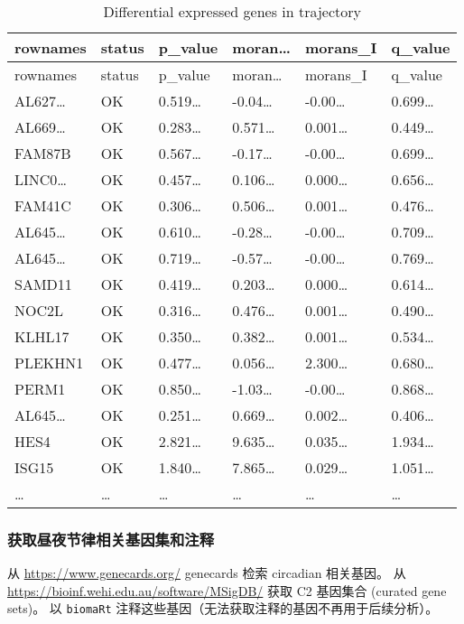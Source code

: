 \documentclass[
]{article}
\begin{document}
\begin{longtable}[]{@{}llllll@{}}
\caption{\label{tab:differential-expressed-genes-in-trajectory}Differential expressed genes in trajectory}\tabularnewline
\toprule
rownames & status & p\_value & moran\ldots{} & morans\_I & q\_value\tabularnewline
\midrule
\endfirsthead
\toprule
rownames & status & p\_value & moran\ldots{} & morans\_I & q\_value\tabularnewline
\midrule
\endhead
AL627\ldots{} & OK & 0.519\ldots{} & -0.04\ldots{} & -0.00\ldots{} & 0.699\ldots{}\tabularnewline
AL669\ldots{} & OK & 0.283\ldots{} & 0.571\ldots{} & 0.001\ldots{} & 0.449\ldots{}\tabularnewline
FAM87B & OK & 0.567\ldots{} & -0.17\ldots{} & -0.00\ldots{} & 0.699\ldots{}\tabularnewline
LINC0\ldots{} & OK & 0.457\ldots{} & 0.106\ldots{} & 0.000\ldots{} & 0.656\ldots{}\tabularnewline
FAM41C & OK & 0.306\ldots{} & 0.506\ldots{} & 0.001\ldots{} & 0.476\ldots{}\tabularnewline
AL645\ldots{} & OK & 0.610\ldots{} & -0.28\ldots{} & -0.00\ldots{} & 0.709\ldots{}\tabularnewline
AL645\ldots{} & OK & 0.719\ldots{} & -0.57\ldots{} & -0.00\ldots{} & 0.769\ldots{}\tabularnewline
SAMD11 & OK & 0.419\ldots{} & 0.203\ldots{} & 0.000\ldots{} & 0.614\ldots{}\tabularnewline
NOC2L & OK & 0.316\ldots{} & 0.476\ldots{} & 0.001\ldots{} & 0.490\ldots{}\tabularnewline
KLHL17 & OK & 0.350\ldots{} & 0.382\ldots{} & 0.001\ldots{} & 0.534\ldots{}\tabularnewline
PLEKHN1 & OK & 0.477\ldots{} & 0.056\ldots{} & 2.300\ldots{} & 0.680\ldots{}\tabularnewline
PERM1 & OK & 0.850\ldots{} & -1.03\ldots{} & -0.00\ldots{} & 0.868\ldots{}\tabularnewline
AL645\ldots{} & OK & 0.251\ldots{} & 0.669\ldots{} & 0.002\ldots{} & 0.406\ldots{}\tabularnewline
HES4 & OK & 2.821\ldots{} & 9.635\ldots{} & 0.035\ldots{} & 1.934\ldots{}\tabularnewline
ISG15 & OK & 1.840\ldots{} & 7.865\ldots{} & 0.029\ldots{} & 1.051\ldots{}\tabularnewline
\ldots{} & \ldots{} & \ldots{} & \ldots{} & \ldots{} & \ldots{}\tabularnewline
\bottomrule
\end{longtable}

\hypertarget{ux83b7ux53d6ux663cux591cux8282ux5f8bux76f8ux5173ux57faux56e0ux96c6ux548cux6ce8ux91ca}{%
\subsubsection{获取昼夜节律相关基因集和注释}\label{ux83b7ux53d6ux663cux591cux8282ux5f8bux76f8ux5173ux57faux56e0ux96c6ux548cux6ce8ux91ca}}

从 \url{https://www.genecards.org/} genecards 检索 circadian 相关基因。
从 \url{https://bioinf.wehi.edu.au/software/MSigDB/} 获取 C2 基因集合 (curated gene sets)。
以 \texttt{biomaRt} 注释这些基因（无法获取注释的基因不再用于后续分析）。
\end{document}
